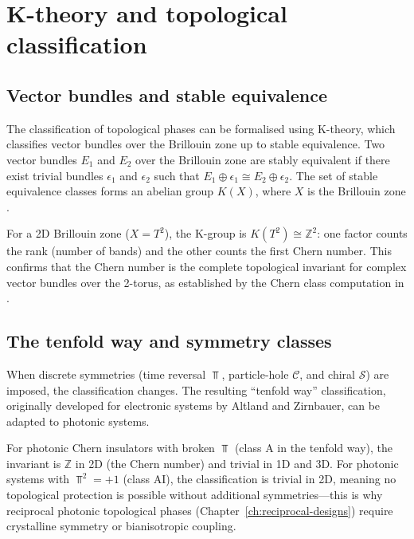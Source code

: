 \section{K-theory and topological classification} \cite{kawabata2019symmetry,kim2020recent,bernevig2013topological}
\label{sec:appB-k-theory}

\subsection{Vector bundles and stable equivalence}
\label{sec:appB-vector-bundles}

The classification of topological phases can be formalised using
K-theory, which classifies vector bundles over the Brillouin zone
up to stable equivalence.  Two vector bundles $E_1$ and $E_2$ over
the Brillouin zone are stably equivalent if there exist trivial
bundles $\epsilon_1$ and $\epsilon_2$ such that
$E_1\oplus\epsilon_1\cong E_2\oplus\epsilon_2$.  The set of stable
equivalence classes forms an abelian group $K(X)$, where $X$ is the
Brillouin zone \cite{ozawa2018topological}.

For a 2D Brillouin zone ($X=T^2$), the K-group is
$K(T^2)\cong\mathbb{Z}^2$: one factor counts the rank (number of
bands) and the other counts the first Chern number.  This confirms
that the Chern number is the complete topological invariant for
complex vector bundles over the 2-torus, as established by the
Chern class computation in .

\subsection{The tenfold way and symmetry classes}
\label{sec:appB-tenfold}

When discrete symmetries (time reversal $\Top$, particle-hole
$\mathcal{C}$, and chiral $\mathcal{S}$) are imposed, the
classification changes.  The resulting ``tenfold way'' classification,
originally developed for electronic systems by Altland and Zirnbauer,
can be adapted to photonic systems.

For photonic Chern insulators with broken $\Top$ (class A in the
tenfold way), the invariant is $\mathbb{Z}$ in 2D (the Chern number)
and trivial in 1D and 3D.  For photonic systems with $\Top^2=+1$
(class AI), the classification is trivial in 2D, meaning no
topological protection is possible without additional symmetries---this
is why reciprocal photonic topological phases
(Chapter~\ref{ch:reciprocal-designs}) require crystalline symmetry
or bianisotropic coupling.

